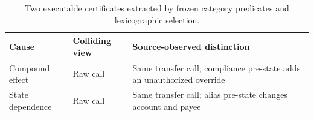 \begin{table}[t]
\centering
\scriptsize
\setlength{\tabcolsep}{2pt}
\caption{Two executable certificates extracted by frozen category predicates
and lexicographic selection.}
\label{tab:failure-certificates}
\begin{tabular}{p{}p{}p{}}
\toprule
Cause & Colliding view & Source-observed distinction \\
\midrule
Compound effect & Raw call & Same transfer call; compliance pre-state adds an unauthorized override \\
State dependence & Raw call & Same transfer call; alias pre-state changes account and payee \\
\bottomrule
\end{tabular}
\end{table}
